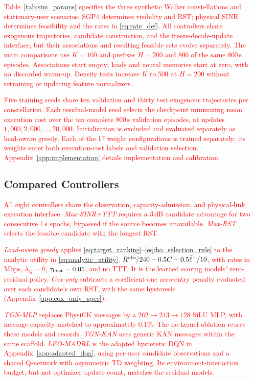 \documentclass[10pt,letterpaper,journal]{IEEEtran}
\newcommand{\revnew}[1]{\textcolor{red}{#1}}
\begin{document}
\revnew{Table~\ref{tab:sim_params} specifies the three synthetic Walker constellations and stationary-user scenarios. SGP4 determines visibility and RST; physical SINR determines feasibility and the rates in \eqref{eq:rate_def}. All controllers share exogenous trajectories, candidate construction, and the freeze-decide-update interface, but their associations and resulting feasible sets evolve separately. The main comparisons use $K=100$ and prefixes $H=200$ and $800$ of the same 800\,s episodes. Associations start empty; loads and neural memories start at zero, with no discarded warm-up. Density tests increase $K$ to 500 at $H=200$ without retraining or updating feature normalizers.}

\revnew{Five training seeds share ten validation and thirty test exogenous trajectories per constellation. Each residual-model seed selects the checkpoint minimizing mean execution cost over the ten complete 800\,s validation episodes, at updates $1{,}000,2{,}000,\ldots,20{,}000$. Initialization is excluded and evaluated separately as load-aware greedy. Each of the 17 weight configurations is trained separately; its weights enter both execution-cost labels and validation selection. Appendix~\ref{app:implementation} details implementation and calibration.}

\subsection{Compared Controllers}
\revnew{All eight controllers share the observation, capacity-admission, and physical-link execution interface. \emph{Max-SINR+TTT} requires a 3\,dB candidate advantage for two consecutive 1\,s epochs, bypassed if the source becomes unavailable. \emph{Max-RST} selects the feasible candidate with the longest RST.}

\revnew{\emph{Load-aware greedy} applies \eqref{eq:target_ranking}--\eqref{eq:ho_selection_rule} to the analytic utility in \eqref{eq:analytic_utility}, $R^{\rm obs}/240-0.5C-0.5\tilde\ell^+/10$, with rates in Mbps, $\lambda_Q=0$, $\tau_{\rm hyst}=0.05$, and no TTT. It is the learned scoring models' zero-residual policy. \emph{Cox-only} subtracts a coefficient-one zero-entry penalty evaluated over each candidate's own RST, with the same hysteresis (Appendix~\ref{app:cox_only_spec}).}

\revnew{\emph{TGN-MLP} replaces PhysiCK messages by a $262\to213\to128$ SiLU MLP, with message capacity matched to approximately $0.1\%$. The no-kernel ablation reuses these models and records. \emph{TGN-KAN} uses generic KAN messages within the same scaffold. \emph{LEO-MADRL} is the adapted hysteretic DQN in Appendix~\ref{app:adapted_dqn}, using per-user candidate observations and a shared Q-network with asymmetric TD weighting. Its environment-interaction budget, but not optimizer-update count, matches the residual models.}
\end{document}
